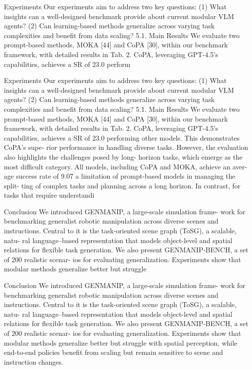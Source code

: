 \documentclass{beamer}
\begin{document}
\begin{frame}{Experiments}
Our experiments aim to address two key questions: (1)
What insights can a well-designed benchmark provide
about current modular VLM agents? (2) Can learning-based
methods generalize across varying task complexities and
benefit from data scaling?
5.1. Main Results
We evaluate two prompt-based methods, MOKA [44] and
CoPA [30], within our benchmark framework, with detailed
results in Tab. 2. CoPA, leveraging GPT-4.5’s capabilities,
achieves a SR of 23.0%
perform
\end{frame}

\begin{frame}{Experiments}
Our experiments aim to address two key questions: (1)
What insights can a well-designed benchmark provide
about current modular VLM agents? (2) Can learning-based
methods generalize across varying task complexities and
benefit from data scaling?
5.1. Main Results
We evaluate two prompt-based methods, MOKA [44] and
CoPA [30], within our benchmark framework, with detailed
results in Tab. 2. CoPA, leveraging GPT-4.5’s capabilities,
achieves a SR of 23.0%
performing other models. This demonstrates CoPA’s supe-
rior performance in handling diverse tasks. However, the
evaluation also highlights the challenges posed by long-
horizon tasks, which emerge as the most difficult category.
All models, including CoPA and MOKA, achieve an aver-
age success rate of 9.07%
a limitation of prompt-based models in managing the split-
ting of complex tasks and planning across a long horizon.
In contrast, for tasks that require understandi
\end{frame}

\begin{frame}{Conclusion}
We introduced GENMANIP, a large-scale simulation frame-
work for benchmarking generalist robotic manipulation
across diverse scenes and instructions.
Central to it is
the task-oriented scene graph (ToSG), a scalable, natu-
ral language–based representation that models object-level
and spatial relations for flexible task generation. We also
present GENMANIP-BENCH, a set of 200 realistic scenar-
ios for evaluating generalization. Experiments show that
modular methods generalize better but struggle
\end{frame}

\begin{frame}{Conclusion}
We introduced GENMANIP, a large-scale simulation frame-
work for benchmarking generalist robotic manipulation
across diverse scenes and instructions.
Central to it is
the task-oriented scene graph (ToSG), a scalable, natu-
ral language–based representation that models object-level
and spatial relations for flexible task generation. We also
present GENMANIP-BENCH, a set of 200 realistic scenar-
ios for evaluating generalization. Experiments show that
modular methods generalize better but struggle with spatial
perception, while end-to-end policies benefit from scaling
but remain sensitive to scene and instruction changes.
\end{frame}
\end{document}
